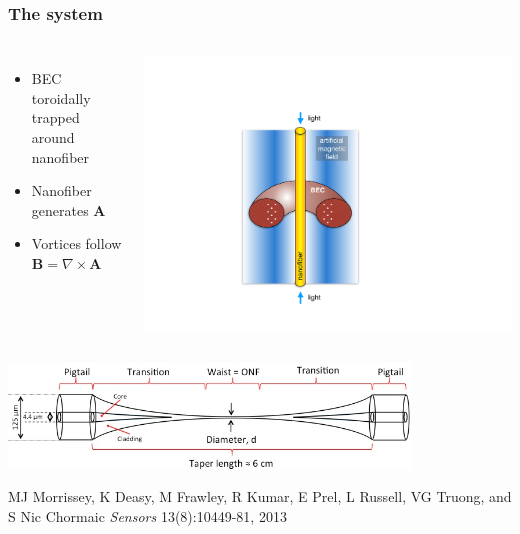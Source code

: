 \documentclass{beamer}
\begin{document}
\begin{frame}
\frametitle{The system}

\begin{columns}

\begin{itemize}
\item BEC toroidally trapped around nanofiber
\item Nanofiber generates $\mathbf{A}$
\item Vortices follow $\mathbf{B} = \nabla \times \mathbf{A}$
\end{itemize}

\includegraphics[width=\textwidth]{../data/3d/Schematic_TB}
\end{columns}

\center \includegraphics[width=0.8\textwidth]{nanofiber.png}

\tiny MJ Morrissey, K Deasy, M Frawley, R Kumar, E Prel, L Russell, VG Truong, and S Nic Chormaic \textit{Sensors} 13(8):10449-81, 2013

\end{frame}
\end{document}
